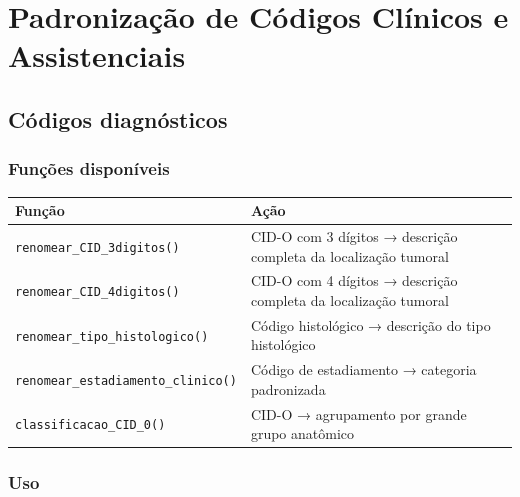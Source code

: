 \documentclass[
  brazilian,
  a4paper,
  oneside]{scrbook}
\newcounter{none} %
\begin{document}

\chapter{Padronização de Códigos Clínicos e
Assistenciais}\label{padronizauxe7uxe3o-de-cuxf3digos-cluxednicos-e-assistenciais}

\section{Códigos diagnósticos}\label{cuxf3digos-diagnuxf3sticos}

\subsection{Funções disponíveis}\label{funuxe7uxf5es-disponuxedveis}

{\def\LTcaptype{none} %
\begin{longtable}[]{@{}
  >{\raggedright\arraybackslash}p{}
  >{\raggedright\arraybackslash}p{}@{}}
\toprule\noalign{}
\begin{minipage}[b]{\linewidth}\raggedright
Função
\end{minipage} & \begin{minipage}[b]{\linewidth}\raggedright
Ação
\end{minipage} \\
\midrule\noalign{}
\endhead
\bottomrule\noalign{}
\endlastfoot
\texttt{renomear\_CID\_3digitos()} & CID-O com 3 dígitos → descrição
completa da localização tumoral \\
\texttt{renomear\_CID\_4digitos()} & CID-O com 4 dígitos → descrição
completa da localização tumoral \\
\texttt{renomear\_tipo\_histologico()} & Código histológico → descrição
do tipo histológico \\
\texttt{renomear\_estadiamento\_clinico()} & Código de estadiamento →
categoria padronizada \\
\texttt{classificacao\_CID\_0()} & CID-O → agrupamento por grande grupo
anatômico \\
\end{longtable}
}

\subsection{Uso}\label{uso-5}
\end{document}
